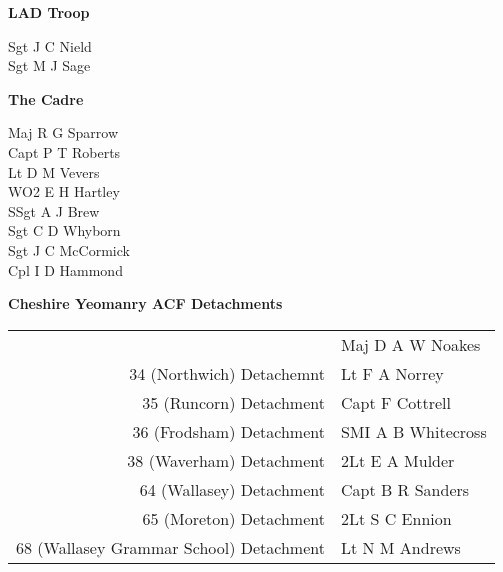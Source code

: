\begin{center}
  \Large
  \textbf{LAD Troop}
\end{center}

\begin{multicols}{2}
  \noindent
  Sgt J C Nield \\
  Sgt M J Sage \\
\end{multicols}

\begin{center}
  \Large
  \textbf{The Cadre}
\end{center}

\begin{multicols}{2}
  \noindent
  Maj R G Sparrow \\
  Capt P T Roberts \\
  Lt D M Vevers \\
  WO2 E H Hartley \\
  SSgt A J Brew \\
  Sgt C D Whyborn \\
  Sgt J C McCormick \\
  Cpl I D Hammond \\
\end{multicols}

\begin{center}
  \Large
  \textbf{Cheshire Yeomanry ACF Detachments}
\end{center}

\begin{center}
  \begin{tabular}{rl}
    & Maj D A W Noakes \\
    34 (Northwich) Detachemnt & Lt F A Norrey \\
    35 (Runcorn) Detachment & Capt F Cottrell \\
    36 (Frodsham) Detachment & SMI A B Whitecross \\
    38 (Waverham) Detachment & 2Lt E A Mulder \\
    64 (Wallasey) Detachment & Capt B R Sanders \\
    65 (Moreton) Detachment & 2Lt S C Ennion \\
    68 (Wallasey Grammar School) Detachment & Lt N M Andrews \\
  \end{tabular}
\end{center}
